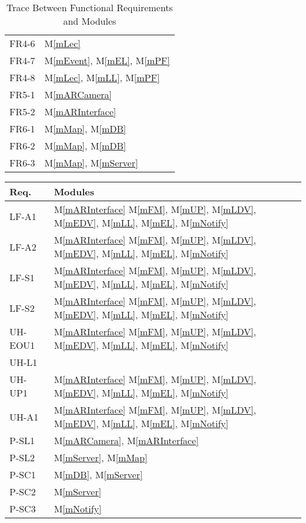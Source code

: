 \documentclass[12pt, titlepage]{article}
\newcommand{\mref}[1]{M\ref{#1}}
\begin{document}
\begin{table}[H]
\begin{tabular}{p{} p{}}
FR4-6 & \mref{mLec}\\
FR4-7 & \mref{mEvent}, \mref{mEL}, \mref{mPF}\\
FR4-8 & \mref{mLec}, \mref{mLL}, \mref{mPF}\\
FR5-1 & \mref{mARCamera}\\
FR5-2 & \mref{mARInterface}\\
FR6-1 & \mref{mMap}, \mref{mDB}\\
FR6-2 & \mref{mMap}, \mref{mDB}\\
FR6-3 & \mref{mMap}, \mref{mServer}\\
\bottomrule
\end{tabular}
\caption{Trace Between Functional Requirements and Modules}
\label{TblFRT}
\end{table}

\begin{table}[H]
\centering
\begin{tabular}{p{} p{}}
\toprule
\textbf{Req.} & \textbf{Modules}\\
\midrule
LF-A1 & \mref{mARInterface} \mref{mFM}, \mref{mUP}, \mref{mLDV}, \mref{mEDV}, \mref{mLL}, \mref{mEL}, \mref{mNotify}\\
LF-A2 & \mref{mARInterface} \mref{mFM}, \mref{mUP}, \mref{mLDV}, \mref{mEDV}, \mref{mLL}, \mref{mEL}, \mref{mNotify}\\
LF-S1 & \mref{mARInterface} \mref{mFM}, \mref{mUP}, \mref{mLDV}, \mref{mEDV}, \mref{mLL}, \mref{mEL}, \mref{mNotify}\\
LF-S2 & \mref{mARInterface} \mref{mFM}, \mref{mUP}, \mref{mLDV}, \mref{mEDV}, \mref{mLL}, \mref{mEL}, \mref{mNotify}\\
UH-EOU1 & \mref{mARInterface} \mref{mFM}, \mref{mUP}, \mref{mLDV}, \mref{mEDV}, \mref{mLL}, \mref{mEL}, \mref{mNotify}\\
UH-L1 & \\
UH-UP1 & \mref{mARInterface} \mref{mFM}, \mref{mUP}, \mref{mLDV}, \mref{mEDV}, \mref{mLL}, \mref{mEL}, \mref{mNotify}\\
UH-A1 & \mref{mARInterface} \mref{mFM}, \mref{mUP}, \mref{mLDV}, \mref{mEDV}, \mref{mLL}, \mref{mEL}, \mref{mNotify}\\
P-SL1 & \mref{mARCamera}, \mref{mARInterface}\\
P-SL2 & \mref{mServer}, \mref{mMap}\\
P-SC1 & \mref{mDB}, \mref{mServer}\\
P-SC2 & \mref{mServer}\\
P-SC3 & \mref{mNotify}\\

\end{tabular}
\end{table}
\end{document}
